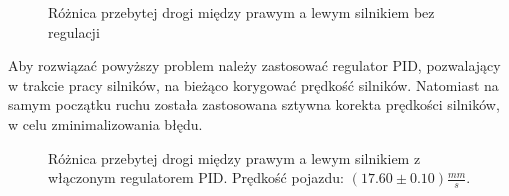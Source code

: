             \begin{figure}[!ht]
                \centering
                \renewcommand{\figurename}{Wykres}
                \caption{Różnica przebytej drogi między prawym a lewym silnikiem bez regulacji}
                \label{plot:distance_err_in_time_const_speed}
            \end{figure}

            Aby rozwiązać powyższy problem należy zastosować regulator PID, pozwalający w trakcie pracy silników, na bieżąco korygować prędkość silników.
            Natomiast na samym początku ruchu została zastosowana sztywna korekta prędkości silników, w celu zminimalizowania błędu.
            \begin{figure}[!ht]
                \centering
                \renewcommand{\figurename}{Wykres}
                \caption{Różnica przebytej drogi między prawym a lewym silnikiem z włączonym regulatorem PID. Prędkość pojazdu: $(17.60 \pm 0.10)\frac{mm}{s}$.}
                \label{plot:PID_distance_err_in_time}
            \end{figure}

